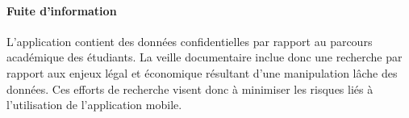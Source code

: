 	\paragraph{Fuite d'information} L'application contient des données confidentielles par rapport au parcours académique des étudiants. La veille documentaire inclue donc une recherche par rapport aux enjeux légal et économique résultant d'une manipulation lâche des données. Ces efforts de recherche visent donc à minimiser les risques liés à l'utilisation de l'application mobile.
	
	
	
	
	
	
	
	
	
	
	
	
	
	